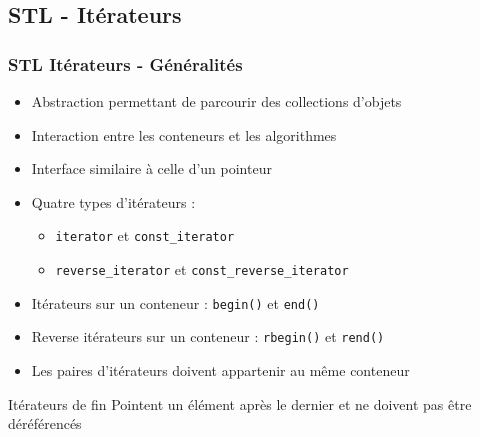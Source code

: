 \documentclass[C++.tex]{subfiles}
\begin{document}
\subsection*{STL - Itérateurs}
\begin{frame}
	\frametitle{STL Itérateurs - Généralités}
	\begin{itemize}
		\item Abstraction permettant de parcourir des collections d'objets
		\item Interaction entre les conteneurs et les algorithmes
		\item Interface similaire à celle d'un pointeur
		\item Quatre types d'itérateurs :
		\begin{itemize}
			\item \lstinline|iterator| et \lstinline|const_iterator|
			\item \lstinline|reverse_iterator| et \lstinline|const_reverse_iterator|


		\end{itemize}
		\item Itérateurs sur un conteneur : \lstinline|begin()| et \lstinline|end()|
		\item Reverse itérateurs sur un conteneur : \lstinline|rbegin()| et \lstinline|rend()|
		\item Les paires d'itérateurs doivent appartenir au même conteneur
	\end{itemize}

	\begin{alertblock}{Itérateurs de fin}
		Pointent un élément après le dernier et ne doivent pas être déréférencés
	\end{alertblock}
\end{frame}
\end{document}

